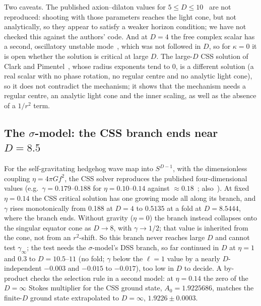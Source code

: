 \documentclass[aps,prd,onecolumn,superscriptaddress,nofootinbib,10pt]{revtex4-2}
\begin{document}
Two caveats. The published axion--dilaton values for $5 \le D \le 10$~\cite{AlvarezGaumeHatefi2012} are not reproduced:
shooting with those parameters reaches the light cone, but not analytically, so they appear to satisfy a weaker horizon
condition; we have not checked this against the authors' code. And at $D = 4$ the free complex scalar has a second,
oscillatory unstable mode~\cite{HirschmannEardley1995b}, which was not followed in $D$, so for $\kappa = 0$ it is open
whether the solution is critical at large $D$. The large-$D$ CSS solution of Clark and Pimentel~\cite{ClarkPimentel2025},
whose radius exponents tend to 0, is a different solution (a real scalar with no phase rotation, no regular centre and no
analytic light cone), so it does not contradict the mechanism; it shows that the mechanism needs a regular centre, an
analytic light cone and the inner scaling, as well as the absence of a $1/r^2$ term.

\subsection{The $\sigma$-model: the CSS branch ends near $D = 8.5$}

For the self-gravitating hedgehog wave map into $S^{D-1}$, with the dimensionless coupling $\eta = 4\pi Gf^2$, the CSS
solver reproduces the published four-dimensional values (e.g.\ $\gamma = 0.179$--$0.188$ for $\eta = 0.10$--$0.14$ against
$\approx 0.18$~\cite{LechnerEtAl2002}; also~\cite{BizonWasserman2000,BizonChmajTabor2000,BiernatBizonMaliborski2017}).
At fixed $\eta = 0.14$ the CSS critical solution has
one growing mode all along its branch, and $\gamma$ rises monotonically from 0.188 at $D = 4$ to $0.5135$ at a fold at
$D = 8.5444$, where the branch ends. Without gravity ($\eta = 0$) the branch instead collapses onto the singular equator
cone as $D \to 8$, with $\gamma \to 1/2$; that value is inherited from the cone, not from an $r^2$-shift. So this branch never
reaches large $D$ and cannot test $\gamma_\infty$; the test needs the $\sigma$-model's DSS branch, so far continued in $D$
at $\eta = 1$ and $0.3$ to $D = 10.5$--$11$ (no fold; $\gamma$ below the $\ell = 1$ value by a nearly $D$-independent
$-0.003$ and $-0.015$ to $-0.017$), too low in $D$ to decide. A by-product checks the selection rule in a second model: at $\eta = 0.14$ the zero of the $D = \infty$ Stokes
multiplier for the CSS ground state, $A_0 = 1.9225686$, matches the finite-$D$ ground state extrapolated to $D = \infty$,
$1.9226 \pm 0.0003$.
\end{document}
